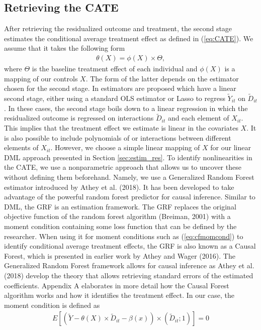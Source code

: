 \subsection{Retrieving the CATE}
After retrieving the residualized outcome and treatment, the second stage estimates the conditional average treatment effect as defined in (\ref{eq:CATE}). We assume that it takes the following form
\begin{align} 
    \theta(X)=\phi(X) \times \Theta, \label{eq:CATE}
\end{align} 
where $\Theta$ is the baseline treatment effect of each individual and $\phi(X)$ is a mapping of our controls $X$. The form of the latter depends on the estimator chosen for the second stage. In \cite{DML2017} estimators are proposed which have a linear second stage, either using a standard OLS estimator or Lasso to regress $\tilde{Y}_{it}$ on $\tilde{D}_{it}$. In these cases, the second stage boils down to a linear regression in which the residualized outcome is regressed on interactions $\tilde{D}_{it}$ and each element of $X_{it}$. This implies that the treatment effect we estimate is linear in the covariates $X$. It is also possible to include polynomials of or interactions between different elements of $X_{it}$. However, we choose a simple linear mapping of $X$ for our linear DML approach presented in Section \ref{sec:estim_res}. To identify nonlinearities in the CATE, we use a nonparametric approach that allows us to uncover these without defining them beforehand. Namely, we use a Generalized Random Forest estimator introduced by Athey et al. (2018). It has been developed to take advantage of the powerful random forest predictor for causal inference. Similar to DML, the GRF is an estimation framework. The GRF replaces the original objective function of the random forest algorithm (Breiman, 2001) with a moment condition containing some loss function that can be defined by the researcher. When using it for moment conditions such as (\ref{eq:cfmomcond}) to identify conditional average treatment effects, the GRF is also known as a Causal Forest, which is presented in earlier work by Athey and Wager (2016). The Generalized Random Forest framework allows for causal inference as Athey et al. (2018) develop the theory that allows retrieving standard errors of the estimated coefficients. Appendix A elaborates in more detail how the Causal Forest algorithm works and how it identifies the treatment effect. In our case, the moment condition is defined as 
\begin{align}
    E \left[\left(\tilde{Y}- \theta(X) \times \tilde{D}_{it} - \beta(x)\right) \times (\tilde{D}_{it}; 1) \right] = 0 \label{eq:cfmomcond}
\end{align}
